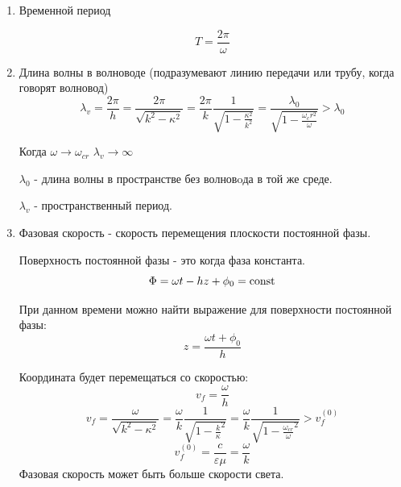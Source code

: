 \begin{enumerate}
\item Временной период 

\begin{equation*}
T = \frac{2 \pi}{\omega}
\end{equation*}

\item Длина волны в волноводе (подразумевают линию передачи или трубу, когда говорят волновод)
\begin{equation*}
\lambda_v = \frac{2 \pi}{h} = \frac{2 \pi}{\sqrt{k^2 - \kappa^2}} = \frac{2 \pi}{k} \frac{1}{\sqrt{1 - \frac{\kappa^2}{k^2}}} = \frac{\lambda_0}{\sqrt{1 - \frac{\omega_cr^2}{\omega}}} > \lambda_0
\end{equation*}

Когда $\omega \rightarrow \omega_{cr}$	$\lambda_{v} \rightarrow \infty$

$\lambda_0$ - длина волны в пространстве без волновoда в той же среде.

$\lambda_{v}$ - пространственный период.

\item Фазовая скорость - скорость перемещения плоскости постоянной фазы.

Поверхность постоянной фазы - это когда фаза константа.
\begin{equation*}
\Phi = \omega t - h z + \phi_0 = \operatorname{const}
\end{equation*}

При данном времени можно найти выражение для поверхности постоянной фазы:
\begin{equation*}
z = \frac{\omega t  + \phi_0}{ h }
\end{equation*}

Координата будет перемещаться со скоростью:
\begin{equation*}
v_f = \frac{\omega}{h}
\end{equation*}
\begin{equation*}
v_f = 
\frac{\omega}{\sqrt{k^2 - \kappa^2}} = 
\frac{\omega}{k} \frac{1}{\sqrt{1 - {\frac{k}{\kappa}^2}}} = \frac{\omega}{k} \frac{1}{\sqrt{1 - {\frac{\omega_{cr}}{\omega}^2}}} > v_f^{(0)}
\end{equation*}
\begin{equation*}
v_f^{(0)} = \frac{c}{\varepsilon \mu} = \frac{\omega}{k}
\end{equation*}
Фазовая скорость может быть больше скорости света.


\end{enumerate}
